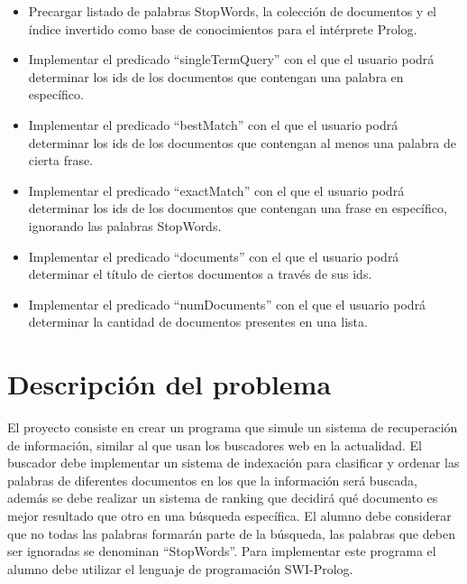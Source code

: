 \documentclass[letterpaper,12pt]{report}
\begin{document}
\begin{itemize}
    \item Precargar listado de palabras StopWords, la colección de documentos y el índice invertido como base de conocimientos para el intérprete Prolog.

    \item Implementar el predicado ``singleTermQuery'' con el que el usuario podrá determinar los ids de los documentos que contengan una palabra en específico.

    \item Implementar el predicado ``bestMatch'' con el que el usuario podrá determinar los ids de los documentos que contengan al menos una palabra de cierta frase.

    \item Implementar el predicado ``exactMatch'' con el que el usuario podrá determinar los ids de los documentos que contengan una frase en específico, ignorando las palabras StopWords.

    \item Implementar el predicado ``documents'' con el que el usuario podrá determinar el título de ciertos documentos a través de sus ids.

    \item Implementar el predicado ``numDocuments'' con el que el usuario podrá determinar la cantidad de documentos presentes en una lista.

\end{itemize}


\chapter{Descripción del problema}

El proyecto consiste en crear un programa que simule un sistema de recuperación de información, similar al que usan los buscadores web en la actualidad. El buscador debe implementar un sistema de indexación para clasificar y ordenar las palabras de diferentes documentos en los que la información será buscada, además se debe realizar un sistema de ranking que decidirá qué documento es mejor resultado que otro en una búsqueda específica. El alumno debe considerar que no todas las palabras formarán parte de la búsqueda, las palabras que deben ser ignoradas se denominan ``StopWords''. Para implementar este programa el alumno debe utilizar el lenguaje de programación SWI-Prolog.
\end{document}
